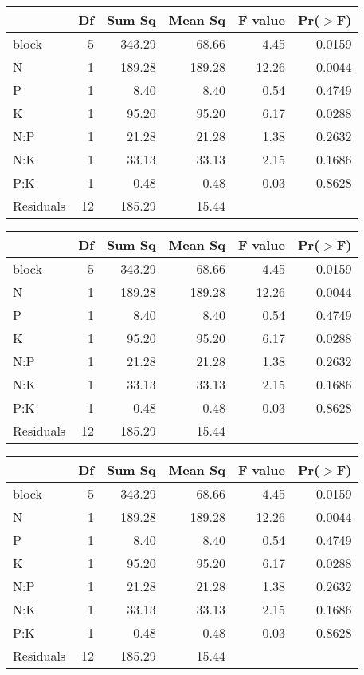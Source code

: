 \documentclass[10pt, fullpage, a4paper, titlepage]{article}
\begin{document}
\begin{table}[ht]
\centering
\begin{tabular}{lrrrrr}
  \hline
 & Df & Sum Sq & Mean Sq & F value & Pr($>$F) \\ 
  \hline
block & 5 & 343.29 & 68.66 & 4.45 & 0.0159 \\ 
  N & 1 & 189.28 & 189.28 & 12.26 & 0.0044 \\ 
  P & 1 & 8.40 & 8.40 & 0.54 & 0.4749 \\ 
  K & 1 & 95.20 & 95.20 & 6.17 & 0.0288 \\ 
  N:P & 1 & 21.28 & 21.28 & 1.38 & 0.2632 \\ 
  N:K & 1 & 33.13 & 33.13 & 2.15 & 0.1686 \\ 
  P:K & 1 & 0.48 & 0.48 & 0.03 & 0.8628 \\ 
  Residuals & 12 & 185.29 & 15.44 &  &  \\ 
   \hline
\end{tabular}
\end{table}
\begin{table}[ht]
\centering
\begin{tabular}{lrrrrr}
  \hline
 & Df & Sum Sq & Mean Sq & F value & Pr($>$F) \\ 
  \hline
block & 5 & 343.29 & 68.66 & 4.45 & 0.0159 \\ 
  N & 1 & 189.28 & 189.28 & 12.26 & 0.0044 \\ 
  P & 1 & 8.40 & 8.40 & 0.54 & 0.4749 \\ 
  K & 1 & 95.20 & 95.20 & 6.17 & 0.0288 \\ 
  N:P & 1 & 21.28 & 21.28 & 1.38 & 0.2632 \\ 
  N:K & 1 & 33.13 & 33.13 & 2.15 & 0.1686 \\ 
  P:K & 1 & 0.48 & 0.48 & 0.03 & 0.8628 \\ 
  Residuals & 12 & 185.29 & 15.44 &  &  \\ 
   \hline
\end{tabular}
\end{table}
\begin{table}[ht]
\centering
\begin{tabular}{lrrrrr}
  \hline
 & Df & Sum Sq & Mean Sq & F value & Pr($>$F) \\ 
  \hline
block       & 5 & 343.29 & 68.66 & 4.45 & 0.0159 \\ 
  N           & 1 & 189.28 & 189.28 & 12.26 & 0.0044 \\ 
  P           & 1 & 8.40 & 8.40 & 0.54 & 0.4749 \\ 
  K           & 1 & 95.20 & 95.20 & 6.17 & 0.0288 \\ 
  N:P         & 1 & 21.28 & 21.28 & 1.38 & 0.2632 \\ 
  N:K         & 1 & 33.13 & 33.13 & 2.15 & 0.1686 \\ 
  P:K         & 1 & 0.48 & 0.48 & 0.03 & 0.8628 \\ 
  Residuals   & 12 & 185.29 & 15.44 &  &  \\ 
   \hline
\end{tabular}
\end{table}
\end{document}
